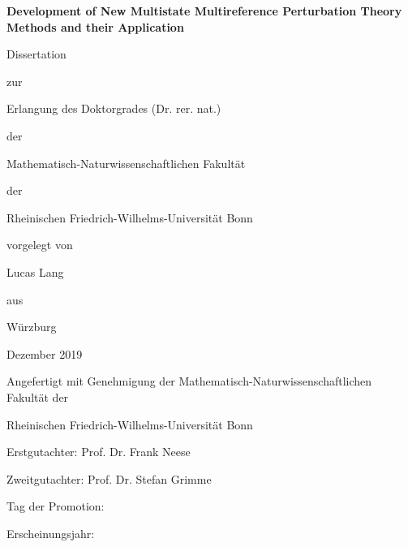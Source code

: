 





\renewcommand{\nomname}{Abbreviations}

\begin{titlepage}
\begin{center}
\linespread{1.5}
\vspace*{2cm}

{\huge \textbf{Development of New Multistate Multireference Perturbation Theory Methods and their Application}}

\vspace{2cm}

\large
Dissertation

zur

Erlangung des Doktorgrades (Dr. rer. nat.)

der

Mathematisch-Naturwissenschaftlichen Fakultät

der

Rheinischen Friedrich-Wilhelms-Universität Bonn

\vspace{1cm}

vorgelegt von

Lucas Lang

aus

Würzburg

\vspace{2cm}

Dezember 2019




\end{center}
\end{titlepage}



\thispagestyle{empty}

\begin{flushleft}
\linespread{3}
\vspace*{10cm}

\begin{center}
Angefertigt mit Genehmigung der Mathematisch-Naturwissenschaftlichen Fakultät der 

\vspace{0.5cm}

Rheinischen Friedrich-Wilhelms-Universität Bonn
\end{center}


\vspace{6cm}

Erstgutachter: Prof. Dr. Frank Neese

\vspace{0.5cm}

Zweitgutachter: Prof. Dr. Stefan Grimme

\vspace{0.5cm}

Tag der Promotion:

\vspace{0.5cm}

Erscheinungsjahr:
\end{flushleft}

